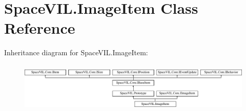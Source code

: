 \hypertarget{class_space_v_i_l_1_1_image_item}{}\section{Space\+V\+I\+L.\+Image\+Item Class Reference}
\label{class_space_v_i_l_1_1_image_item}
Inheritance diagram for Space\+V\+I\+L.\+Image\+Item\+:\begin{figure}[H]
\begin{center}
\leavevmode
\includegraphics[height=2.421622cm]{class_space_v_i_l_1_1_image_item}
\end{center}
\end{figure}
